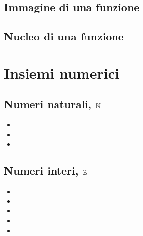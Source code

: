 \documentclass[letterpaper,10pt,italian]{jupyterBook}
\begin{document}
\subsection{Immagine di una funzione}
\label{\detokenize{ch/set:immagine-di-una-funzione}}\label{\detokenize{ch/set:math-hs-fun-range}}

\subsection{Nucleo di una funzione}
\label{\detokenize{ch/set:nucleo-di-una-funzione}}\label{\detokenize{ch/set:math-hs-fun-null}}

\section{Insiemi numerici}
\label{\detokenize{ch/set:insiemi-numerici}}\label{\detokenize{ch/set:math-hs-set-numbers}}

\subsection{Numeri naturali, \protect\(\mathbb{N}\protect\)}
\label{\detokenize{ch/set:numeri-naturali-mathbb-n}}\label{\detokenize{ch/set:math-hs-set-numbers-n}}\begin{itemize}
\item {} 
\sphinxAtStartPar
{}

\item {} 
\sphinxAtStartPar
{}

\item {} 
\sphinxAtStartPar
{}

\end{itemize}


\subsection{Numeri interi, \protect\(\mathbb{Z}\protect\)}
\label{\detokenize{ch/set:numeri-interi-mathbb-z}}\label{\detokenize{ch/set:math-hs-set-numbers-z}}\begin{itemize}
\item {} 
\sphinxAtStartPar
{}

\item {} 
\sphinxAtStartPar
{}

\item {} 
\sphinxAtStartPar
{}

\item {} 
\sphinxAtStartPar
{}

\item {} 
\sphinxAtStartPar
{}

\end{itemize}
\end{document}
